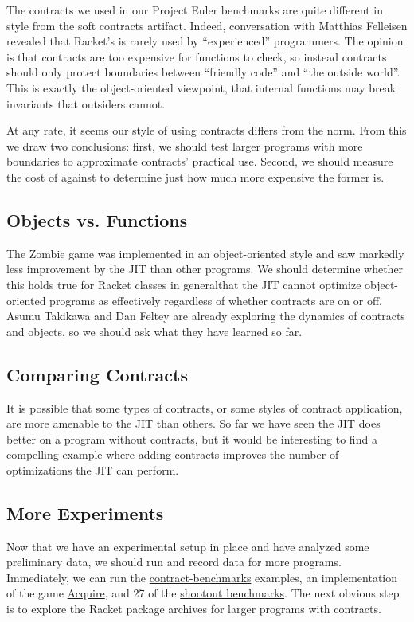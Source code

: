The contracts we used in our Project Euler benchmarks are quite different in style from the soft contracts artifact.
Indeed, conversation with Matthias Felleisen revealed that Racket's  is rarely used by ``experienced'' programmers.
The opinion is that contracts are too expensive for functions to check, so instead contracts should only protect boundaries between ``friendly code'' and ``the outside world''.
This is exactly the object-oriented viewpoint, that internal functions may break invariants that outsiders cannot.

At any rate, it seems our style of using contracts differs from the norm.
From this we draw two conclusions: first, we should test larger programs with more boundaries to approximate contracts' practical use.
Second, we should measure the cost of  against  to determine just how much more expensive the former is.

\subsection{Objects vs. Functions}

The Zombie game was implemented in an object-oriented style and saw markedly less improvement by the JIT than other programs.
We should determine whether this holds true for Racket classes in general\textemdash that the JIT cannot optimize object-oriented programs as effectively regardless of whether contracts are on or off.
Asumu Takikawa and Dan Feltey are already exploring the dynamics of contracts and objects, so we should ask what they have learned so far.

\subsection{Comparing Contracts}
It is possible that some types of contracts, or some styles of contract application, are more amenable to the JIT than others.
So far we have seen the JIT does better on a program without contracts, but it would be interesting to find a compelling example where adding contracts improves the number of optimizations the JIT can perform.

\subsection{More Experiments}

Now that we have an experimental setup in place and have analyzed some preliminary data, we should run and record data for more programs.
Immediately, we can run the \href{https://github.com/stamourv/contract-benchmarks}{contract-benchmarks} examples, an implementation of the game \href{https://github.com/LeifAndersen/experimental-methods-in-pl/tree/master/Acquire}{Acquire}, and 27 of the \href{https://github.com/LeifAndersen/experimental-methods-in-pl/tree/master/shootout}{shootout benchmarks}.
The next obvious step is to explore the Racket package archives for larger programs with contracts.

